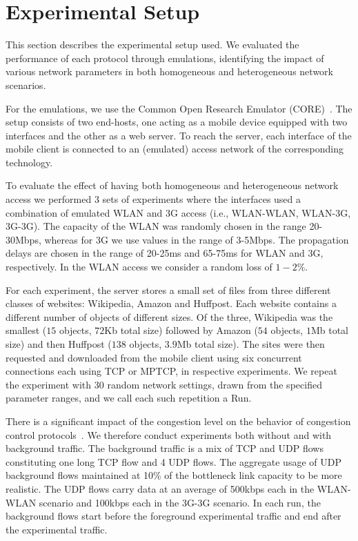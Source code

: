 \section{Experimental Setup }
\label{sec:exp-setup}
This section describes the experimental setup used. We
evaluated the performance of each protocol through emulations, identifying the impact of various network
parameters in both homogeneous and heterogeneous network scenarios. 

For the emulations, we use the Common Open Research Emulator (CORE)~\cite{CORE}. The setup consists of
two end-hosts, one acting as a mobile device equipped with two interfaces and the other as a web server. To reach the
server, each interface of the mobile client is connected to an (emulated) access network of the corresponding technology.

To evaluate the effect of having both homogeneous and heterogeneous network access we performed 3 sets
of experiments where the interfaces used a combination of emulated WLAN and 3G access (i.e., WLAN-WLAN, WLAN-3G, 3G-3G).
The capacity of the WLAN was randomly chosen in the range 20-30Mbps, whereas for 3G we use values in the range of 3-5Mbps.
The propagation delays are chosen in the range of 20-25ms and 65-75ms for WLAN and 3G, respectively. In the WLAN access
we consider a random loss of $1-2\%$.

For each experiment, the server stores a small set of files from three different classes
of websites: Wikipedia, Amazon and Huffpost. Each website contains a different number of objects of different sizes.
Of the three, Wikipedia was the smallest ($15$ objects, $72$Kb total size) followed by Amazon ($54$ objects, $1$Mb total size)
and then Huffpost ($138$ objects, $3.9$Mb total size). The sites were then requested and downloaded from the mobile
client using six concurrent connections each using TCP or MPTCP, in respective experiments. We repeat the experiment with 30 random
network settings, drawn from the specified parameter ranges, and we call each such repetition a Run. 


There is a significant impact of the congestion level on the behavior of congestion control protocols~\cite{ha-background-traffic-comnet-2007}.
We therefore conduct experiments both without and with background traffic.  The background traffic is a mix of TCP and UDP flows constituting one
long TCP flow and 4 UDP flows. The aggregate usage of UDP background flows maintained at 10\% of the bottleneck link capacity to be more realistic.
The UDP flows carry data at an average of 500kbps each in the WLAN-WLAN scenario and 100kbps each in the 3G-3G scenario.  In each run, the background flows
start before the foreground experimental traffic and end after the experimental traffic.



